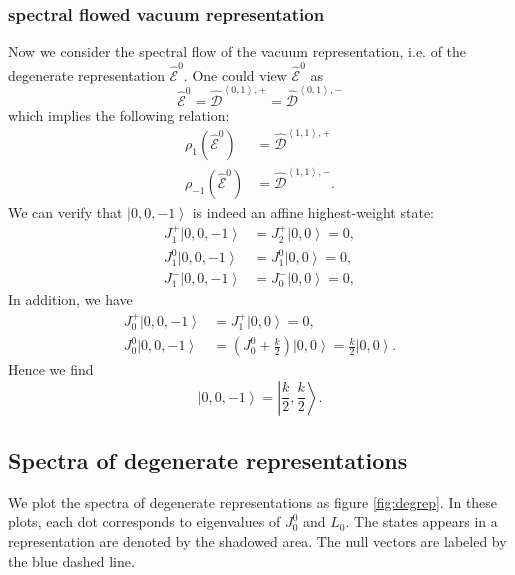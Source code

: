 \documentclass[10pt,a4paper]{article}
\numberwithin{equation}{section}
\newcommand{\ket}[1]{\left| #1 \right\rangle}
\newcommand{\vev}[1]{\left\langle #1 \right\rangle}
\begin{document}
\subsubsection*{spectral flowed vacuum representation} 
Now we consider the spectral flow of the vacuum representation, i.e. of the degenerate representation $\widehat{\mathcal{E}}^{0}$. 
One could view $\widehat{\mathcal{E}}^{0}$ as
\begin{equation}
    \widehat{\mathcal{E}}^{0} = \hat{\mathcal{D}}^{\vev{0,1},+} = \hat{\mathcal{D}}^{\vev{0,1},-}
\end{equation}
which implies the following relation: 
\begin{equation}
    \begin{aligned}
        \rho_{1} \left(\widehat{\mathcal{E}}^{0}\right) &= \hat{\mathcal{D}}^{\vev{1,1},+}\\
        \rho_{-1} \left(\widehat{\mathcal{E}}^{0}\right) &= \hat{\mathcal{D}}^{\vev{1,1},-}.
    \end{aligned}
\end{equation}
We can verify that $\ket{0,0,-1}$ is indeed an affine highest-weight state:
\begin{equation}
    \begin{aligned}
        J^{+}_{1} \ket{0,0,-1} &= J^{+}_{2} \ket{0,0} = 0, \\
        J^{0}_{1} \ket{0,0,-1} &= J^{0}_{1} \ket{0,0} = 0, \\
        J^{-}_{1} \ket{0,0,-1} &= J^{-}_{0} \ket{0,0} = 0, 
    \end{aligned}
\end{equation}
In addition, we have 
\begin{equation}
    \begin{aligned}
        J^{+}_{0} \ket{0,0,-1} &= J^{+}_{1} \ket{0,0} = 0,\\
        J^{0}_{0} \ket{0,0,-1} &= \left(J^{0}_{0} + \frac{k}{2} \right) \ket{0,0} = \frac{k}{2} \ket{0,0}.
    \end{aligned}
\end{equation}
Hence we find 
\begin{equation}
    \ket{0,0,-1} = \ket{\frac{k}{2}, \frac{k}{2}}.
\end{equation}

\subsection{Spectra of degenerate representations}
We plot the spectra of degenerate representations as figure \ref{fig:degrep}. In these plots, each dot corresponds to eigenvalues of $J^{0}_{0}$ and 
$L_{0}$. The states appears in a representation are denoted by the shadowed area. The null vectors are labeled by the blue dashed line. 
\end{document}
